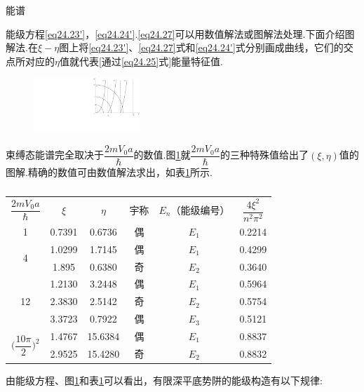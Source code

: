 {\heiti 能谱}

能级方程\eqref{eq24.23'}，\eqref{eq24.24'}.\eqref{eq24.27}可以用数值解法或图解法处理.下面介绍图解法.在$\xi-\eta$图上将\eqref{eq24.23'}、\eqref{eq24.27}式和\eqref{eq24.24'}式分别画成曲线，它们的交点所对应的$\eta$值就代表[通过\eqref{eq24.25}式]能量特征值.
\begin{figure}[!h]
	\centering
	\includegraphics[width=4cm,clip]{QM file/figure/2-5}
	\caption{}\label{fig.2-5}
\end{figure}
束缚态能谱完全取决于$\dfrac{2mV_{0}a}{\hbar}$的数值.图\ref{fig.2-5}就$\dfrac{2mV_{0}a}{\hbar}$的三种特殊值给出了$(\xi,\eta)$值的图解.精确的数值可由数值解法求出，如表\ref{lab.2-1}所示.
\begin{table}[!h]
	\begin{center}
		\caption{}\label{lab.2-1}
		\begin{tabular}{c|c|c|c|c|c}
			\hline 
			\multirow{2}{*}{$\dfrac{2mV_{0}a}{\hbar}$} & \multirow{2}{*}{$\xi$} & \multirow{2}{*}{$\eta$} & \multirow{2}{*}{宇称} & \multirow{2}{*}{$E_{n}$（能级编号）} & \multirow{2}{*}{$\dfrac{4\xi^{2}}{n^{2}\pi^{2}}$} \\ 
			&  &  &  &  &  \\ \hline
			1 & 0.7391 & 0.6736 & 偶 & $E_{1}$ & 0.2214 \\ \hline
			\multirow{2}{*}{4} & 1.0299 & 1.7145 & 偶 & $E_{1}$ & 0.4299 \\ \cline{2-6}
			& 1.895 & 0.6380 & 奇 & $E_{2}$ & 0.3640 \\ \hline
			\multirow{3}{*}{12} & 1.2130 & 3.2448 & 偶 & $E_{1}$ & 0.5964 \\ \cline{2-6}
			& 2.3830 & 2.5142 & 奇 & $E_{2}$ & 0.5754 \\ \cline{2-6}
			& 3.3723 & 0.7922 & 偶 & $E_{3}$ & 0.5121 \\ \hline
			\multirow{2}{*}{$\bigg(\dfrac{10\pi}{2}\bigg)^{2}$} & 1.4767 & 15.6384 & 偶 & $E_{1}$ & 0.8837 \\ \cline{2-6}
			& 2.9525 & 15.4280 & 奇 & $E_{2}$ & 0.8832 \\ \hline
		\end{tabular}
	\end{center}
\end{table}

由能级方程、图\ref{fig.2-5}和表\ref{lab.2-1}可以看出，有限深平底势阱的能级构造有以下规律:

